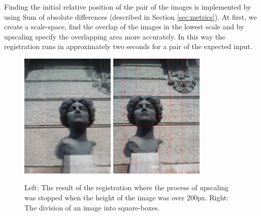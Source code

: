 Finding the initial relative position of the pair of the images is implemented by using Sum of absolute differences (described in Section \ref{sec:metrics}).
At first, we create a scale-space, find the overlap of the images in the lowest scale and by upscaling specify the overlapping area more accurately.
In this way the registration runs in approximately two seconds for a pair of the expected input.


\begin{figure}[h]
\centerline{
\includegraphics[width=4.5cm]{img/ema_overlap.png}
\includegraphics[width=4.5cm]{img/ema_buckets.png}}
\caption{Left: The result of the registration where the process of upscaling was stopped when the height of the image was over 200px. Right: The division of an image into square-boxes.}
\label{fig:overlap_and_buckets}
\end{figure}

